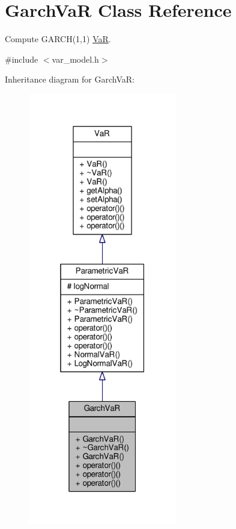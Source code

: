 \hypertarget{classGarchVaR}{}\section{Garch\+VaR Class Reference}
\label{classGarchVaR}


Compute G\+A\+R\+C\+H(1,1) \hyperlink{classVaR}{VaR}.  




{\ttfamily \#include $<$var\+\_\+model.\+h$>$}



Inheritance diagram for Garch\+VaR\+:
\nopagebreak
\begin{figure}[H]
\begin{center}
\leavevmode
\includegraphics[width=184pt]{classGarchVaR__inherit__graph}
\end{center}
\end{figure}


